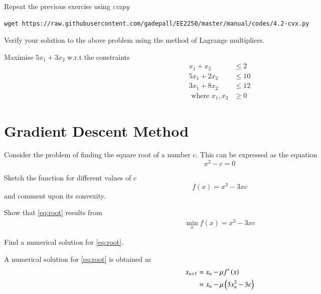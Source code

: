 \documentclass[journal,12pt,twocolumn]{IEEEtran}
\begin{document}
\begin{problem}
Repeat the previous exercise using {\em cvxpy}
\end{problem}
\solution
\begin{lstlisting}
wget https://raw.githubusercontent.com/gadepall/EE2250/master/manual/codes/4.2-cvx.py
\end{lstlisting}

\begin{problem}
	Verify your solution to the above problem using the method of Lagrange multipliers.
\end{problem}
%
\begin{problem}
	 Maximise $5x_1 + 3x_2$ w.r.t the constraints
	 \begin{align}
	 x_1 + x_2 &\leq 2 \nonumber\\
	 5x_1 + 2x_2 &\leq 10 \nonumber\\
	 3x_1 + 8x_2 &\leq 12 \nonumber\\
	 \text{ where } x_1,x_2 &\geq 0 \nonumber
	 \end{align}	
\end{problem}
\section{Gradient Descent Method}
Consider the problem of finding the square root of a number $c$.  This can be expressed as the equation
%
\begin{equation}
\label{eq:root}
x^2 -c= 0
\end{equation}
%
\begin{problem}
Sketch the function for different values of $c$
%
\begin{equation}
f(x)= x^{3}-3xc
\end{equation}
%
and comment upon its convexity.
\end{problem}
\begin{problem}
Show that \eqref{eq:root} results from
\begin{align}
\min_{x}f(x)= x^{3}-3xc
\end{align}
\end{problem}
\begin{problem}
Find a numerical solution for \eqref{eq:root}.
\end{problem}
\solution
A numerical solution for \eqref{eq:root} is obtained as
%
\begin{align}
x_{n+1}&=x_{n}-\mu f^{\prime}\left(x\right)
\\
&=x_{n} -\mu \left(3x_n^{2}-3c\right)
\label{eq:gradient}
\end{align}
\end{document}
